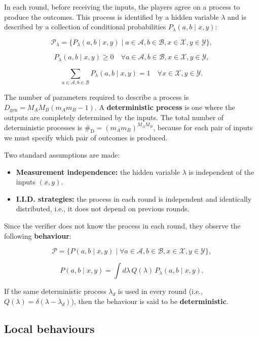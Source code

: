 \documentclass[12pt, letterpaper]{article}
\begin{document}
In each round, before receiving the inputs, the players agree on a process to produce the outcomes. This process is identified by a hidden variable $\lambda$ and is described by a collection of conditional probabilities $P_\lambda(a,b \mid x,y)$:

\[
\mathcal{P}_\lambda = \{ P_\lambda(a,b \mid x,y) \mid a\in \mathcal{A}, b \in \mathcal{B}, x \in \mathcal{X}, y \in \mathcal{Y} \},
\]

\[
P_\lambda (a,b \mid x,y) \geq 0 \quad \forall a\in \mathcal{A}, b \in \mathcal{B}, x \in \mathcal{X}, y \in \mathcal{Y},
\]

\[
\sum_{a\in \mathcal{A}, b\in \mathcal{B}} P_\lambda(a,b \mid x,y) = 1 \quad \forall x \in \mathcal{X}, y\in \mathcal{Y}.
\]

The number of parameters required to describe a process is $D_{\text{gen}} = M_A M_B (m_A m_B - 1)$. A \textbf{deterministic process} is one where the outputs are completely determined by the inputs. The total number of deterministic processes is $\#_{\text{D}} = (m_A m_B)^{M_A M_B}$, because for each pair of inputs we must specify which pair of outcomes is produced.

Two standard assumptions are made:
\begin{itemize}
    \item \textbf{Measurement independence:} the hidden variable $\lambda$ is independent of the inputs $(x,y)$.
    \item \textbf{I.I.D. strategies:} the process in each round is independent and identically distributed, i.e., it does not depend on previous rounds.
\end{itemize}

Since the verifier does not know the process in each round, they observe the following \textbf{behaviour}:

\[
\mathcal{P} = \{ P(a,b \mid x, y) \mid \forall a\in \mathcal{A}, b \in \mathcal{B}, x \in \mathcal{X}, y \in \mathcal{Y}\},
\]

\[
P(a,b \mid x, y) = \int d\lambda \, Q(\lambda) \, P_\lambda(a,b \mid x,y).
\]

If the same deterministic process $\lambda_d$ is used in every round (i.e., $Q(\lambda) = \delta(\lambda - \lambda_d)$), then the behaviour is said to be \textbf{deterministic}.

\subsection{Local behaviours}
\end{document}
